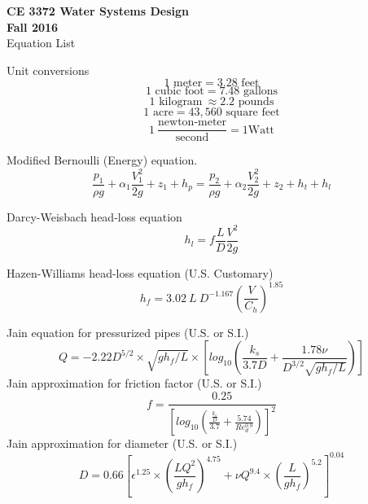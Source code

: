 \documentclass[12pt]{article}
\begin{document}
\begingroup
\begin{center}
{\textbf{{ CE 3372 Water Systems Design}  \\ Fall 2016} \\
Equation List}
\end{center}
\endgroup

Unit conversions\\
\begin{equation}
1\text{~meter} = 3.28\text{~feet}
\end{equation}
\begin{equation}
1\text{~cubic foot} = 7.48\text{~gallons}
\end{equation}
\begin{equation}
1\text{~kilogram} ~\approx 2.2\text{~pounds}
\end{equation}
\begin{equation}
1\text{~acre} = 43,560\text{~square feet}
\end{equation}
\begin{equation}
1~\frac{\text{newton-meter}}{\text{second}} = 1\text{Watt}
\end{equation}

Modified Bernoulli (Energy) equation.
\begin{equation}
\frac{p_1}{\rho g}+\alpha_1 \frac{V_1^2}{2g} + z_1 + h_p =
\frac{p_2}{\rho g}+\alpha_2 \frac{V_2^2}{2g} + z_2 + h_t + h_l
\end{equation}

Darcy-Weisbach head-loss equation
\begin{equation}
h_l=f \frac{L}{D}\frac{V^2}{2g}
\end{equation}

Hazen-Williams head-loss equation (U.S. Customary)
\begin{equation}
h_f = 3.02~ L~D^{-1.167} (\frac{V}{C_h})^{1.85}
\end{equation}

Jain equation for pressurized pipes (U.S. or S.I.)
\begin{equation}
Q=-2.22D^{5/2} \times \sqrt{gh_f/L}\times[log_{10} (\frac{k_s}{3.7D} + \frac{1.78\nu}{D^{3/2}\sqrt{gh_f/L}} )]
\end{equation}
Jain approximation for friction factor  (U.S. or S.I.)
\begin{equation}
f=\frac{0.25}{[log_{10} (\frac{\frac{k_e}{D}} {3.7} + \frac{5.74}{Re_d^{0.9} } )]  ^2}
\label{eqn:friction-factor-jain}
\end{equation}
Jain approximation for diameter  (U.S. or S.I.)
\begin{equation}
D=0.66[\epsilon^{1.25}\times(\frac{LQ^2}{gh_f})^{4.75}+\nu Q^{9.4}\times(\frac{L}{gh_f})^{5.2}]^{0.04}
\end{equation}
\end{document}
